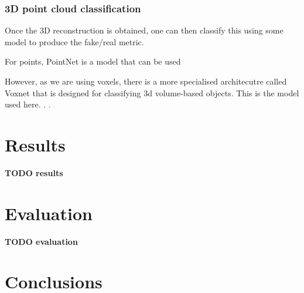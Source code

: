 \documentclass[10pt,a4paper]{article}
\begin{document}
        \subsubsection{3D point cloud classification}
            Once the 3D reconstruction is obtained, one can then classify this using some model to produce the fake/real metric.

            For points, PointNet is a model that can be used 

            However, as we are using voxels, there is a more specialised architecutre called Voxnet that is designed for classifying
            3d volume-based objects. This is the model used here. . \cite{VoxNetModel}.
\section{Results}
    \textbf{TODO results}
\section{Evaluation}
    \textbf{TODO evaluation}


\section{Conclusions}




\end{document}
